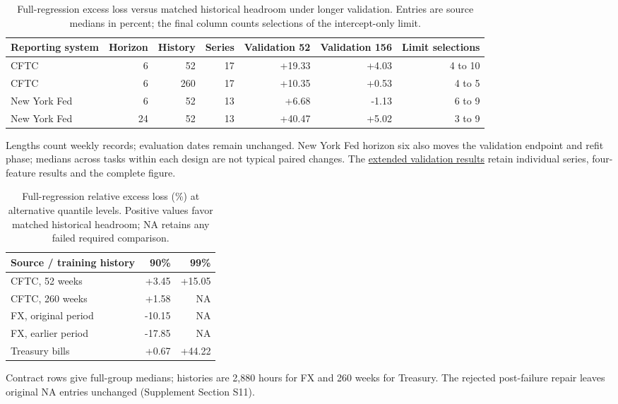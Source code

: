 \documentclass[11pt,a4paper]{article}
\begin{document}
\begin{table}[p]\centering\small
\caption{Full-regression excess loss versus matched historical headroom under longer validation. Entries are source medians in percent; the final column counts selections of the intercept-only limit.}\label{tab:v13-validation}
\begin{tabular}{lrrrrrr}\toprule
Reporting system & Horizon & History & Series & Validation 52 & Validation 156 & Limit selections\\\midrule
CFTC & 6 & 52 & 17 & +19.33 & +4.03 & 4 to 10 \\
CFTC & 6 & 260 & 17 & +10.35 & +0.53 & 4 to 5 \\
New York Fed & 6 & 52 & 13 & +6.68 & -1.13 & 6 to 9 \\
New York Fed & 24 & 52 & 13 & +40.47 & +5.02 & 3 to 9 \\
\bottomrule\end{tabular}
\par\vspace{2pt}\begin{minipage}{.98\linewidth}\footnotesize
Lengths count weekly records; evaluation dates remain unchanged. New York Fed horizon six also moves the validation endpoint and refit phase; medians across tasks within each design are not typical paired changes.
The \href{https://github.com/ByronLi0207/financial-mathematics-paper-20261020/blob/submission-final/EXTENDED_RESULTS.md#asmbi-extended-s38}{extended validation results} retain individual series, four-feature results and the complete figure.
\end{minipage}\end{table}

\clearpage

\begin{table}[p]\centering\small
\caption{Full-regression relative excess loss (\%) at alternative quantile levels. Positive values favor matched historical headroom; NA retains any failed required comparison.}\label{tab:v12-tau}
\begin{tabular}{lrr}\toprule
Source / training history & 90\% & 99\% \\\midrule
CFTC, 52 weeks & +3.45 & +15.05 \\
CFTC, 260 weeks & +1.58 & \textsc{NA} \\
FX, original period & -10.15 & \textsc{NA} \\
FX, earlier period & -17.85 & \textsc{NA} \\
Treasury bills & +0.67 & +44.22 \\
\bottomrule\end{tabular}
\par\vspace{2pt}\begin{minipage}{.95\linewidth}\footnotesize
Contract rows give full-group medians; histories are 2,880 hours for FX and 260 weeks for Treasury.
The rejected post-failure repair leaves original NA entries unchanged (Supplement Section S11).
\end{minipage}\end{table}
\end{document}
